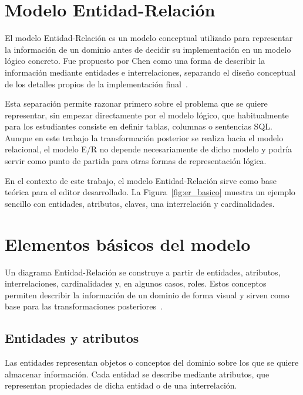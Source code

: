 
\section{Modelo Entidad-Relación}

El modelo Entidad-Relación es un modelo conceptual utilizado para representar la información de un dominio antes de decidir su implementación en un modelo lógico concreto. Fue propuesto por Chen como una forma de describir la información mediante entidades e interrelaciones, separando el diseño conceptual de los detalles propios de la implementación final~\cite{chen1976}.

Esta separación permite razonar primero sobre el problema que se quiere representar, sin empezar directamente por el modelo lógico, que habitualmente para los estudiantes consiste en definir tablas, columnas o sentencias SQL. Aunque en este trabajo la transformación posterior se realiza hacia el modelo relacional, el modelo E/R no depende necesariamente de dicho modelo y podría servir como punto de partida para otras formas de representación lógica.

En el contexto de este trabajo, el modelo Entidad-Relación sirve como base teórica para el editor desarrollado. La Figura~\ref{fig:er_basico} muestra un ejemplo sencillo con entidades, atributos, claves, una interrelación y cardinalidades.


\section{Elementos básicos del modelo}

Un diagrama Entidad-Relación se construye a partir de entidades, atributos, interrelaciones, cardinalidades y, en algunos casos, roles. Estos conceptos permiten describir la información de un dominio de forma visual y sirven como base para las transformaciones posteriores~\cite{tema6}.

\subsection{Entidades y atributos}

Las entidades representan objetos o conceptos del dominio sobre los que se quiere almacenar información. Cada entidad se describe mediante atributos, que representan propiedades de dicha entidad o de una interrelación.

